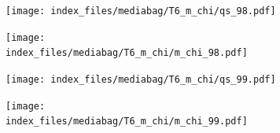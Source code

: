 \documentclass[
  11pt,
  letterpaper,
]{scrreprt}
\begin{document}
\begin{figure}

\begin{minipage}{0.50\linewidth}

\begin{figure}[H]

{\centering \texttt{[image: index\_files/mediabag/T6\_m\_chi/qs\_98.pdf]}

}


\end{figure}%

\end{minipage}%
%
\begin{minipage}{0.50\linewidth}

\begin{figure}[H]

{\centering \texttt{[image: index\_files/mediabag/T6\_m\_chi/m\_chi\_98.pdf]}

}


\end{figure}%

\end{minipage}%

\end{figure}%

\begin{figure}

\begin{minipage}{0.50\linewidth}

\begin{figure}[H]

{\centering \texttt{[image: index\_files/mediabag/T6\_m\_chi/qs\_99.pdf]}

}


\end{figure}%

\end{minipage}%
%
\begin{minipage}{0.50\linewidth}

\begin{figure}[H]

{\centering \texttt{[image: index\_files/mediabag/T6\_m\_chi/m\_chi\_99.pdf]}

}


\end{figure}%

\end{minipage}%

\end{figure}%
\end{document}
